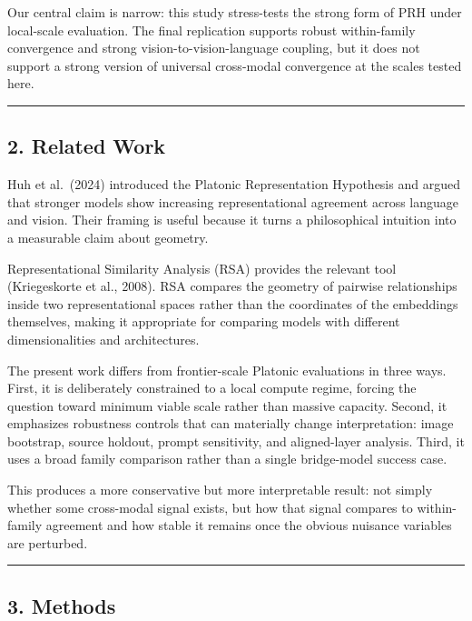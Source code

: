 \documentclass[
]{article}
\begin{document}
Our central claim is narrow: this study stress-tests the strong form of
PRH under local-scale evaluation. The final replication supports robust
within-family convergence and strong vision-to-vision-language
coupling, but it does not support a strong version of universal
cross-modal convergence at the scales tested here.

\begin{center}\rule{0.5\linewidth}{0.5pt}\end{center}

\subsection{2. Related Work}\label{related-work}

Huh et al.~(2024) introduced the Platonic Representation Hypothesis and
argued that stronger models show increasing representational agreement
across language and vision. Their framing is useful because it turns a
philosophical intuition into a measurable claim about geometry.

Representational Similarity Analysis (RSA) provides the relevant tool
(Kriegeskorte et al., 2008). RSA compares the geometry of pairwise
relationships inside two representational spaces rather than the
coordinates of the embeddings themselves, making it appropriate for
comparing models with different dimensionalities and architectures.

The present work differs from frontier-scale Platonic evaluations in
three ways. First, it is deliberately constrained to a local compute
regime, forcing the question toward minimum viable scale rather than
massive capacity. Second, it emphasizes robustness controls that can
materially change interpretation: image bootstrap, source holdout,
prompt sensitivity, and aligned-layer analysis. Third, it uses a broad
family comparison rather than a single bridge-model success case.

This produces a more conservative but more interpretable result: not
simply whether some cross-modal signal exists, but how that signal
compares to within-family agreement and how stable it remains once the
obvious nuisance variables are perturbed.

\begin{center}\rule{0.5\linewidth}{0.5pt}\end{center}

\subsection{3. Methods}\label{methods}
\end{document}
